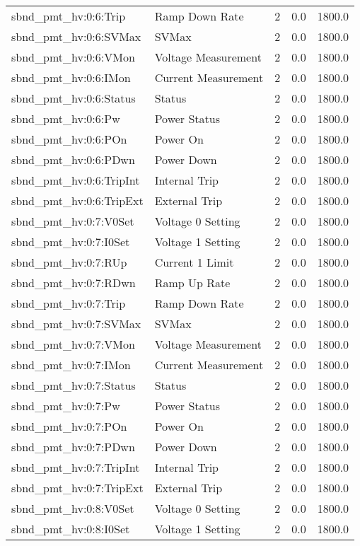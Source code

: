 \begin{center}
\begin{longtable}{l | l l l l }
sbnd\_pmt\_hv:0:6:Trip & Ramp Down Rate & 2 & 0.0 & 1800.0\\ 
sbnd\_pmt\_hv:0:6:SVMax & SVMax & 2 & 0.0 & 1800.0\\ 
sbnd\_pmt\_hv:0:6:VMon & Voltage Measurement & 2 & 0.0 & 1800.0\\ 
sbnd\_pmt\_hv:0:6:IMon & Current Measurement & 2 & 0.0 & 1800.0\\ 
sbnd\_pmt\_hv:0:6:Status & Status & 2 & 0.0 & 1800.0\\ 
sbnd\_pmt\_hv:0:6:Pw & Power Status & 2 & 0.0 & 1800.0\\ 
sbnd\_pmt\_hv:0:6:POn & Power On & 2 & 0.0 & 1800.0\\ 
sbnd\_pmt\_hv:0:6:PDwn & Power Down & 2 & 0.0 & 1800.0\\ 
sbnd\_pmt\_hv:0:6:TripInt & Internal Trip & 2 & 0.0 & 1800.0\\ 
sbnd\_pmt\_hv:0:6:TripExt & External Trip & 2 & 0.0 & 1800.0\\ 
sbnd\_pmt\_hv:0:7:V0Set & Voltage 0 Setting & 2 & 0.0 & 1800.0\\ 
sbnd\_pmt\_hv:0:7:I0Set & Voltage 1 Setting & 2 & 0.0 & 1800.0\\ 
sbnd\_pmt\_hv:0:7:RUp & Current 1 Limit & 2 & 0.0 & 1800.0\\ 
sbnd\_pmt\_hv:0:7:RDwn & Ramp Up Rate & 2 & 0.0 & 1800.0\\ 
sbnd\_pmt\_hv:0:7:Trip & Ramp Down Rate & 2 & 0.0 & 1800.0\\ 
sbnd\_pmt\_hv:0:7:SVMax & SVMax & 2 & 0.0 & 1800.0\\ 
sbnd\_pmt\_hv:0:7:VMon & Voltage Measurement & 2 & 0.0 & 1800.0\\ 
sbnd\_pmt\_hv:0:7:IMon & Current Measurement & 2 & 0.0 & 1800.0\\ 
sbnd\_pmt\_hv:0:7:Status & Status & 2 & 0.0 & 1800.0\\ 
sbnd\_pmt\_hv:0:7:Pw & Power Status & 2 & 0.0 & 1800.0\\ 
sbnd\_pmt\_hv:0:7:POn & Power On & 2 & 0.0 & 1800.0\\ 
sbnd\_pmt\_hv:0:7:PDwn & Power Down & 2 & 0.0 & 1800.0\\ 
sbnd\_pmt\_hv:0:7:TripInt & Internal Trip & 2 & 0.0 & 1800.0\\ 
sbnd\_pmt\_hv:0:7:TripExt & External Trip & 2 & 0.0 & 1800.0\\ 
sbnd\_pmt\_hv:0:8:V0Set & Voltage 0 Setting & 2 & 0.0 & 1800.0\\ 
sbnd\_pmt\_hv:0:8:I0Set & Voltage 1 Setting & 2 & 0.0 & 1800.0\\ 

\end{longtable}
\end{center}
